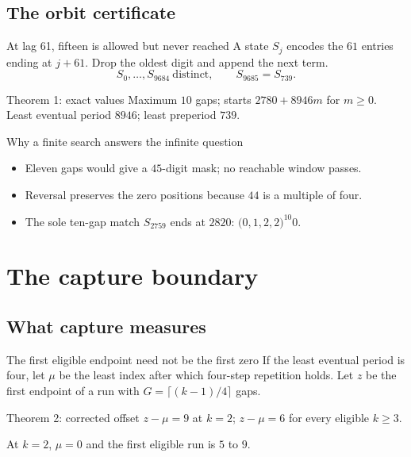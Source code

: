 \documentclass{beamer}
\begin{document}
\subsection{The orbit certificate}
\begin{frame}{At lag 61, fifteen is allowed but never reached}
  A state $S_j$ encodes the $61$ entries ending at $j+61$.
  Drop the oldest digit and append the next term.
  \[S_0,\ldots,S_{9684}\ \text{distinct},\qquad S_{9685}=S_{739}.\]
  \begin{block}{Theorem 1: exact values}
    Maximum $10$ gaps; starts $2780+8946m$ for $m\ge0$.
    Least eventual period $8946$; least preperiod $739$.
  \end{block}
\end{frame}
\begin{frame}{Why a finite search answers the infinite question}
  \begin{itemize}
    \item Eleven gaps would give a $45$-digit mask; no reachable window passes.
    \item Reversal preserves the zero positions because $44$ is a multiple of four.
    \item The sole ten-gap match $S_{2759}$ ends at $2820$:
      $\bigl(0,1,2,2\bigr)^{10}0$.
  \end{itemize}
\end{frame}
\section{The capture boundary}
\subsection{What capture measures}
\begin{frame}{The first eligible endpoint need not be the first zero}
  If the least eventual period is four, let $\mu$ be the least
  index after which four-step repetition holds. Let $z$ be the
  first endpoint of a run with $G=\lceil(k-1)/4\rceil$ gaps.
  \begin{block}{Theorem 2: corrected offset}
    $z-\mu=9$ at $k=2$; $z-\mu=6$ for every eligible $k\ge3$.
  \end{block}
  At $k=2$, $\mu=0$ and the first eligible run is $5$ to $9$.
\end{frame}
\end{document}
